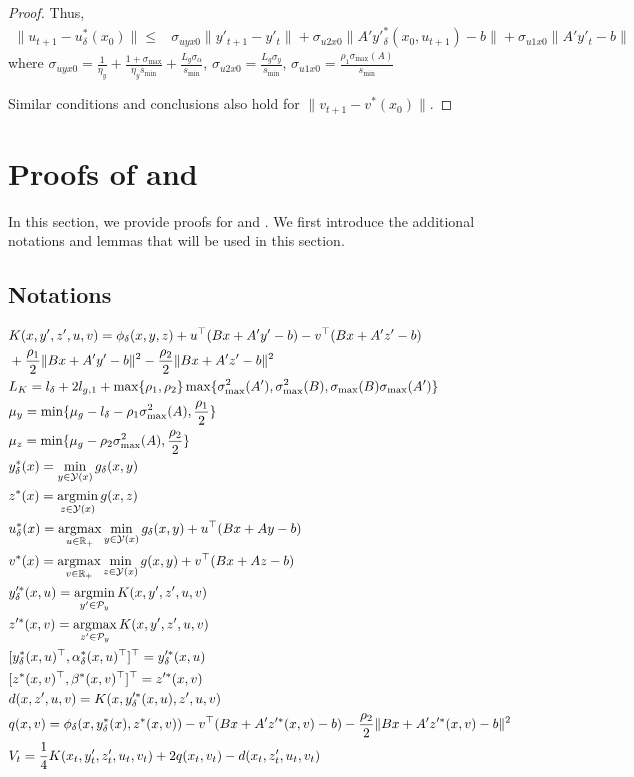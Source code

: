 \documentclass{article}
\newcommand{\Pc}{\mathcal{P}}
\newcommand{\Yc}{\mathcal{Y}}
\def\R{\mathbb{R}}
\newcommand{\argmin}{\mathop{\rm argmin}}
\newcommand{\argmax}{\mathop{\rm argmax}}
\theoremstyle{plain}
\theoremstyle{definition}
\theoremstyle{remark}
\begin{document}
\begin{proof}
Thus,
\begin{align*}
    \|u_{t+1}-u^*_\delta(x_0)\|\leq& \sigma_{uyx0}\|y'_{t+1}-y'_t\|+\sigma_{u2x0}\|A'y'^*_\delta(x_0,u_{t+1})-b\|+ \sigma_{u1x0}\|A'y'_t-b\|
\end{align*}
where $\sigma_{uyx0}=\frac{1}{\eta_y}+\frac{1+\sigma_{\max}}{\eta_ys_{\min}}+\frac{L_g\sigma_\alpha}{s_{\min}}$, $\sigma_{u2x0}=\frac{L_g\sigma_y}{s_{\min}}$, $\sigma_{u1x0}=\frac{\rho_1 \sigma_{\max}(A)}{s_{\min}}$

Similar conditions and conclusions also hold for $\|v_{t+1}-v^*(x_0)\|$.

\end{proof}

\section{Proofs of  and }\label{app: Bx+Ay}
In this section, we provide proofs for  and .
We first introduce the additional notations and lemmas that will be used in this section.
\subsection*{Notations}
\begin{align*}
    &K(x,y',z',u,v)=\phi_\delta(x, y, z)+u^\top(Bx+A'y'-b)- v^\top(Bx+A'z'-b)\\
    &+\frac{\rho_1}{2}\|Bx+A'y'-b\|^2-\frac{\rho_2}{2}\|Bx+A'z'-b\|^2\\
    &L_K=l_\delta+2 l_{g,1}+\max\{\rho_1, \rho_2\}\max\{\sigma_{\max}^2(A'), \sigma_{\max}^2(B),\sigma_{\max}(B)\sigma_{\max}(A')\}\\
    &\mu_y = \min\{\mu_g-l_\delta-\rho_1\sigma_{\max}^2(A), \frac{\rho_1}{2}\}\\
    &\mu_z = \min\{\mu_g-\rho_2\sigma_{\max}^2(A), \frac{\rho_2}{2}\}\\
    &y^*_\delta(x)=\min_{y \in \Yc(x)} g_{\delta}(x,y)\\
    &z^*(x)=\argmin_{z\in \Yc(x)} g(x,z)\\
    &u^*_\delta(x)=\argmax_{u\in \R_+}\min_{y \in \Yc(x)}g_{\delta}(x,y)+u^\top(Bx+Ay-b)\\
    &v^*(x)=\argmax_{v\in \R_+}\min_{z \in \Yc(x)}g(x,y)+v^\top(Bx+Az-b)\\
    &y'^*_\delta(x,u)=\argmin_{y'\in \Pc_y} K(x,y',z',u,v)\\
    &z'^*(x,v)=\argmax_{z'\in \Pc_y} K(x,y',z',u,v)\\
    &[y^*_\delta(x,u)^\top, \alpha^*_\delta(x,u)^\top]^\top=y'^*_\delta(x,u)\\
    &[z^*(x,v)^\top, \beta^*(x,v)^\top]^\top=z'^*(x,v)\\
    &d(x, z', u, v)=K(x, y'^*_\delta(x,u), z', u,v)\\
    &q(x, v)=\phi_\delta(x, y^*_\delta(x), z^*(x, v))-v^\top(Bx+A'z'^*(x, v)-b)-\frac{\rho_2}{2}\|Bx+A'z'^*(x, v)-b\|^2\\
    &V_t=\frac{1}{4}K(x_t, y'_t, z'_t, u_t, v_t)+2q(x_t,v_t)-d(x_t,z'_t, u_t, v_t)
\end{align*}
\end{document}
